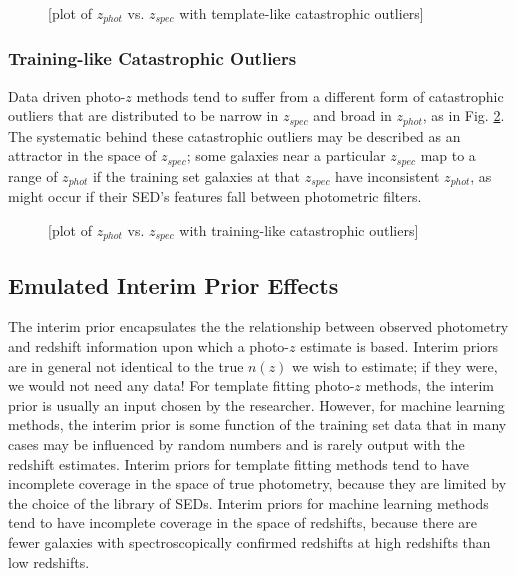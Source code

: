 \documentclass[iop]{emulateapj}
\begin{document}
\begin{figure}
	\begin{center}
		\caption{[plot of $z_{phot}$ vs. $z_{spec}$ with template-like 
catastrophic outliers]}
		\label{fig:tempcatout}
	\end{center}
\end{figure}

\subsubsection{Training-like Catastrophic Outliers}
\label{sec:traincatout}

Data driven photo-$z$ methods tend to suffer from a different form of 
catastrophic outliers that are distributed to be narrow in $z_{spec}$ and broad 
in $z_{phot}$, as in Fig. \ref{fig:traincatout}.  The systematic behind these 
catastrophic outliers may be described as an attractor in the space of 
$z_{spec}$; some galaxies near a particular $z_{spec}$ map to a range of 
$z_{phot}$ if the training set galaxies at that $z_{spec}$ have inconsistent 
$z_{phot}$, as might occur if their SED's features fall between photometric 
filters.

\begin{figure}
	\begin{center}
		\caption{[plot of $z_{phot}$ vs. $z_{spec}$ with training-like 
catastrophic outliers]}
		\label{fig:traincatout}
	\end{center}
\end{figure}

\subsection{Emulated Interim Prior Effects}
\label{sec:priors}

The interim prior encapsulates the the relationship between observed photometry 
and redshift information upon which a photo-$z$ estimate is based.  Interim 
priors are in general not identical to the true $n(z)$ we wish to estimate; if 
they were, we would not need any data!  For template fitting photo-$z$ methods, 
the interim prior is usually an input chosen by the researcher.  However, for 
machine learning methods, the interim prior is some function of the training 
set data that in many cases may be influenced by random numbers and is rarely 
output with the redshift estimates.  Interim priors for template fitting 
methods tend to have incomplete coverage in the space of true photometry, 
because they are limited by the choice of the library of SEDs.  Interim priors 
for machine learning methods tend to have incomplete coverage in the space of 
redshifts, because there are fewer galaxies with spectroscopically confirmed 
redshifts at high redshifts than low redshifts.
\end{document}
